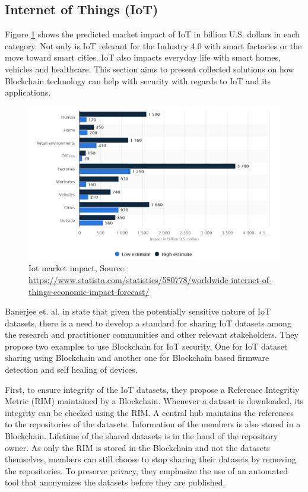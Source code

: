 \subsection{Internet of Things (IoT)}
\label{subsec:03_IoT}

Figure \ref{fig:iot_market} shows the predicted market impact of IoT in billion U.S. dollars in each category.
Not only is IoT relevant for the Industry 4.0 with smart factories or the move toward smart cities. IoT also
impacts everyday life with smart homes, vehicles and healthcare. This section aims to present collected solutions on how  Blockchain technology can help with security with regards to IoT and its applications.


\begin{figure}[ht!]
  \begin{center}
    \includegraphics[scale=0.6]{Talk7/img/iot/iot_statista}
  \end{center}
  \caption{Iot market impact, Source: \protect\url{https://www.statista.com/statistics/580778/worldwide-internet-of-things-economic-impact-forecast/}~\cite{StatistaIoT} }
  \label{fig:iot_market}
\end{figure}

Banerjee et. al. in \cite{Banerjee2018} state that given the potentially sensitive nature of IoT datasets,
there is a need to develop a standard for sharing IoT datasets among the research and practitioner communities
and other relevant stakeholders. They propose two examples to use Blockchain for IoT security. One for IoT dataset sharing using Blockchain and another one for
Blockchain based firmware detection and self healing of devices.

First, to ensure integrity of the IoT datasets, they propose a Reference Integritiy Metric (RIM) maintained by a Blockchain. Whenever a dataset is downloaded, its integrity can be checked using the RIM.
A central hub maintains the references to the repositories of the datasets. Information of the members is also stored in a Blockchain.
Lifetime of the shared datasets is in the hand of the repository owner.
As only the RIM is stored in the Blockchain and not the datasets themselves, members can still choose to stop sharing their datasets by removing the repositories.
To preserve privacy, they emphasize the use of an automated tool that anonymizes the datasets before they are published.



